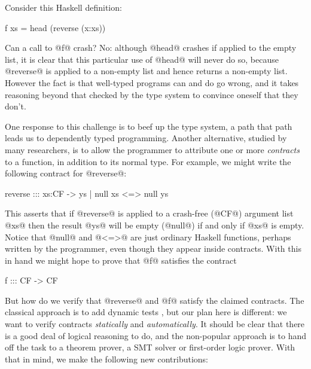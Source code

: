 Consider this Haskell definition:
\begin{code}
  f xs = head (reverse (x:xs))
\end{code}
Can a call to @f@ crash?  No: although @head@ crashes if applied to the
empty list, it is clear that this particular use of @head@ will never
do so, because @reverse@ is applied to a non-empty list and
hence returns a non-empty list.  However the fact is that 
well-typed programs can and do go wrong, and it takes reasoning beyond that
checked by the type system to convince oneself that they don't.

One response to this challenge is to beef up the type system, a path that
path leads us to dependently typed programming.  Another alternative,
studied by many researchers, is to allow the programmer to attribute one or
more \emph{contracts} to a function, in addition to its normal type.
For example, we might write the following contract for @reverse@:
\begin{code}
reverse ::: xs:CF -> { ys | null xs <=> null ys }
\end{code}
This asserts that if @reverse@ is applied to a crash-free (@CF@) argument list @xs@
then the result @ys@ will be empty (@null@) if and only if @xs@ is empty.
Notice that @null@ and @<=>@ are just ordinary Haskell functions, perhaps
written by the programmer, even though they appear inside contracts.
With this in hand we might hope to prove that @f@ satisfies the contract
\begin{code}
f ::: CF -> CF
\end{code}
But how do we verify that @reverse@ and @f@ satisfy the claimed
contracts.  The classical approach is to add dynamic tests
\cite{finder-felliesen}, but our plan here is different: we want to
verify contracts \emph{statically} and \emph{automatically}. It
should be clear that there is a good deal of logical reasoning to do,
and the non-popular approach is to hand off the task to a theorem
prover, a SMT solver or first-order logic prover.
With that in mind, we make the following new contributions:

